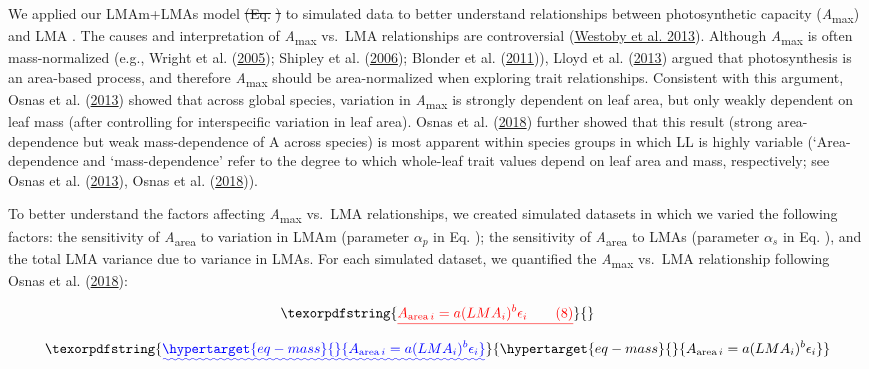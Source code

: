 \documentclass[
  12pt,
  a4paper,
,tablecaptionabove
]{scrartcl}
\providecommand{\DIFaddtex}[1]{{\protect\color{blue}\uwave{#1}}} %
\providecommand{\DIFdeltex}[1]{{\protect\color{red}\sout{#1}}}                      %
\providecommand{\DIFaddbegin}{} %
\providecommand{\DIFaddend}{} %
\providecommand{\DIFdelbegin}{} %
\providecommand{\DIFdelend}{} %
\providecommand{\DIFadd}[1]{\texorpdfstring{\DIFaddtex{#1}}{#1}} %
\providecommand{\DIFdel}[1]{\texorpdfstring{\DIFdeltex{#1}}{}} %
\newcommand{\DIFscaledelfig}{0.5}
\newlength{\DIFdelgraphicswidth} %
\newlength{\DIFdelgraphicsheight} %
\newcommand{\DIFaddincludegraphics}[2][]{{\color{blue}\fbox{\DIFOincludegraphics[#1]{#2}}}} %
\newcommand{\DIFdelincludegraphics}[2][]{%
\sbox{\DIFdelgraphicsbox}{\DIFOincludegraphics[#1]{#2}}%
\settoboxwidth{\DIFdelgraphicswidth}{\DIFdelgraphicsbox} %
\settoboxtotalheight{\DIFdelgraphicsheight}{\DIFdelgraphicsbox} %
\scalebox{\DIFscaledelfig}{%
\parbox[b]{\DIFdelgraphicswidth}{\usebox{\DIFdelgraphicsbox}\\[-\baselineskip] \rule{\DIFdelgraphicswidth}{0em}}\llap{\resizebox{\DIFdelgraphicswidth}{\DIFdelgraphicsheight}{%
\setlength{\unitlength}{\DIFdelgraphicswidth}%
\begin{picture}(1,1)%
\thicklines\linethickness{2pt} %
{\color[rgb]{1,0,0}\put(0,0){\framebox(1,1){}}}%
{\color[rgb]{1,0,0}\put(0,0){\line( 1,1){1}}}%
{\color[rgb]{1,0,0}\put(0,1){\line(1,-1){1}}}%
\end{picture}%
}\hspace*{3pt}}} %
} %
\DeclareRobustCommand{\DIFaddbegin}{\DIFOaddbegin \let\includegraphics\DIFaddincludegraphics} %
\DeclareRobustCommand{\DIFaddend}{\DIFOaddend \let\includegraphics\DIFOincludegraphics} %
\DeclareRobustCommand{\DIFdelbegin}{\DIFOdelbegin \let\includegraphics\DIFdelincludegraphics} %
\DeclareRobustCommand{\DIFdelend}{\DIFOaddend \let\includegraphics\DIFOincludegraphics} %
\begin{document}
We applied our LMAm+LMAs model \DIFdelbegin \DIFdel{(Eq. }%
\DIFdel{) }\DIFdelend to simulated data to better understand
relationships between photosynthetic capacity
(\emph{A}\textsubscript{max}) and LMA \DIFaddbegin \DIFadd{(Eq. \ref{eq:Aarea})}\DIFaddend . The causes
and interpretation of \emph{A}\textsubscript{max} vs.~LMA relationships
are controversial (\protect\hyperlink{ref-Westoby2013}{Westoby et al.
2013}). Although \emph{A}\textsubscript{max} is often mass-normalized
(e.g., Wright et al. (\protect\hyperlink{ref-Wright2005}{2005}); Shipley
et al. (\protect\hyperlink{ref-Shipley2006}{2006}); Blonder et al.
(\protect\hyperlink{ref-Blonder2011}{2011})), Lloyd et al.
(\protect\hyperlink{ref-Lloyd2013}{2013}) argued that photosynthesis is
an area-based process, and therefore \emph{A}\textsubscript{max} should
be area-normalized when exploring trait relationships. Consistent with
this argument, Osnas et al. (\protect\hyperlink{ref-Osnas2013}{2013})
showed that across global species, variation in
\emph{A}\textsubscript{max} is strongly dependent on leaf area, but only
weakly dependent on leaf mass (after controlling for interspecific
variation in leaf area). Osnas et al.
(\protect\hyperlink{ref-Osnas2018}{2018}) further showed that this
result (strong area-dependence but weak mass-dependence of A across
species) is most apparent within species groups in which LL is highly
variable (`Area-dependence and `mass-dependence' refer to the degree to
which whole-leaf trait values depend on leaf area and mass,
respectively; see Osnas et al.
(\protect\hyperlink{ref-Osnas2013}{2013}), Osnas et al.
(\protect\hyperlink{ref-Osnas2018}{2018})).

To better understand the factors affecting \emph{A}\textsubscript{max}
vs.~LMA relationships, we created simulated datasets in which we varied
the following factors: the sensitivity of \emph{A}\textsubscript{area}
to variation in LMAm (parameter \(\alpha_p\) in Eq. \DIFdelbegin %
\DIFdelend \DIFaddbegin \DIFadd{\ref{eq:Aarea}}\DIFaddend ); the
sensitivity of \emph{A}\textsubscript{area} to LMAs (parameter
\(\alpha_s\) in Eq. \DIFdelbegin %
\DIFdelend \DIFaddbegin \DIFadd{\ref{eq:Aarea}}\DIFaddend ), and the total LMA variance due to
variance in LMAs. For each simulated dataset, we quantified the
\emph{A}\textsubscript{max} vs.~LMA relationship following Osnas et al.
(\protect\hyperlink{ref-Osnas2018}{2018}):

\DIFdelbegin \begin{align*}
\DIFdel{A_{\mathrm{area} \, i} = a (LMA_i)^{b}\epsilon_i \tag{8}
}\end{align*}%
\DIFdelend \DIFaddbegin \begin{equation}\DIFadd{\protect\hypertarget{eq-mass}{}{
A_{\mathrm{area} \, i} = a (LMA_i)^{b}\epsilon_i
}\label{eq-mass}}\end{equation}\DIFaddend
\end{document}
